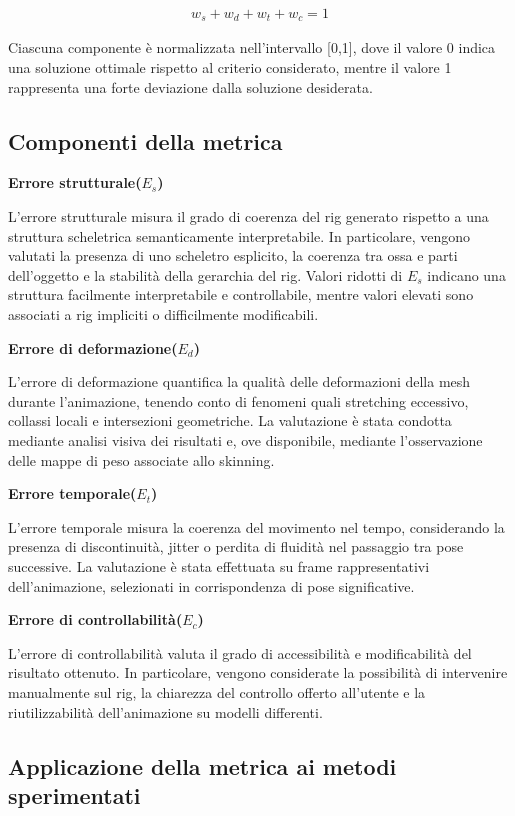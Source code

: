 \begin{align*}
    w_s + w_d + w_t + w_c = 1
\end{align*}

Ciascuna componente è normalizzata nell’intervallo [0,1], dove il valore 0 indica una soluzione ottimale rispetto al criterio considerato, mentre il valore 1 rappresenta una forte deviazione dalla soluzione desiderata.

\subsection{Componenti della metrica}

\textbf{Errore strutturale(${E_s}$)}

L’errore strutturale misura il grado di coerenza del rig generato rispetto a una struttura scheletrica semanticamente interpretabile. In particolare, vengono valutati la presenza di uno scheletro esplicito, la coerenza tra ossa e parti dell’oggetto e la stabilità della gerarchia del rig.
Valori ridotti di ${E_s}$ indicano una struttura facilmente interpretabile e controllabile, mentre valori elevati sono associati a rig impliciti o difficilmente modificabili.

\textbf{Errore di deformazione(${E_d}$)}

L’errore di deformazione quantifica la qualità delle deformazioni della mesh durante l’animazione, tenendo conto di fenomeni quali stretching eccessivo, collassi locali e intersezioni geometriche. La valutazione è stata condotta mediante analisi visiva dei risultati e, ove disponibile, mediante l’osservazione delle mappe di peso associate allo skinning.

\textbf{Errore temporale(${E_t}$)}

L’errore temporale misura la coerenza del movimento nel tempo, considerando la presenza di discontinuità, jitter o perdita di fluidità nel passaggio tra pose successive. La valutazione è stata effettuata su frame rappresentativi dell’animazione, selezionati in corrispondenza di pose significative.

\textbf{Errore di controllabilità(${E_c}$)}

L’errore di controllabilità valuta il grado di accessibilità e modificabilità del risultato ottenuto. In particolare, vengono considerate la possibilità di intervenire manualmente sul rig, la chiarezza del controllo offerto all’utente e la riutilizzabilità dell’animazione su modelli differenti.

\subsection{Applicazione della metrica ai metodi sperimentati}

